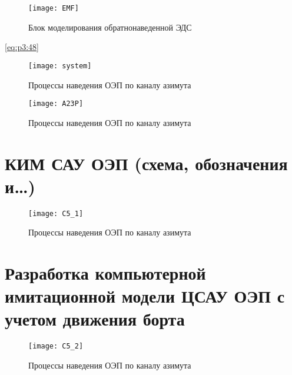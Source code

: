\begin{figure}[ht]
	\centering
	\texttt{[image: EMF]} 
	\caption{Блок моделирования обратнонаведенной ЭДС}
	\label{fig:EMF}
\end{figure}






\ref{eq:p3:48}

\begingroup
\captiondelim{ } %

\endgroup
 
 
\begin{figure}[ht]
 	\centering
 	\texttt{[image: system]} 
 	\caption{Процессы наведения ОЭП по каналу азимута}
 	\label{fig:az_true}
\end{figure}



\begin{figure}[ht]
	\centering
	\texttt{[image: A23P]} 
	\caption{Процессы наведения ОЭП по каналу азимута}
	\label{fig:az_true}
\end{figure}


















\section{КИМ САУ ОЭП (схема, обозначения и…) } \label{ch:ch5/sect2}

\begin{figure}[ht]
	\centering
	\texttt{[image: C5\_1]} 
	\caption{Процессы наведения ОЭП по каналу азимута}
	\label{fig:az_true}
\end{figure}


\section{Разработка компьютерной имитационной модели ЦСАУ ОЭП с учетом  движения борта} \label{ch:ch5/sect3}



\begin{figure}[ht]
	\centering
	\texttt{[image: C5\_2]} 
	\caption{Процессы наведения ОЭП по каналу азимута}
	\label{fig:az_true}
\end{figure}

